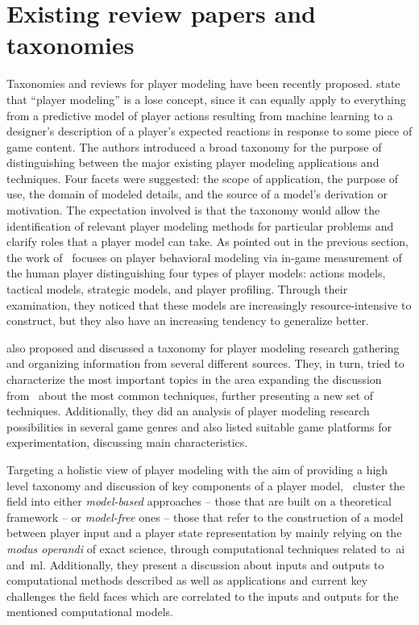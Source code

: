 \section{Existing review papers and taxonomies}\label{reviews}
Taxonomies and reviews for player modeling have been recently proposed. \cite{smith_inclusive_2011} state that ``player modeling'' is a lose concept, since it can equally apply to everything from a predictive model of player actions resulting from machine learning to a designer's description of a player's expected reactions in response to some piece of game content. The authors introduced a broad taxonomy for the purpose of distinguishing between the major existing player modeling applications and techniques. Four facets were suggested: the scope of application, the purpose of use, the domain of modeled details, and the source of a model's derivation or motivation. The expectation involved is that the taxonomy would allow the identification of relevant player modeling methods for particular problems and clarify roles that a player model can take. As pointed out in the previous section, the work of~\cite{bakkes_player_2012} focuses on player behavioral modeling via in-game measurement of the human player distinguishing four types of player models: actions models, tactical models, strategic models, and player profiling. %
Through their examination, they noticed that these models are increasingly resource-intensive to construct, but they also have an increasing tendency to generalize better.%

\cite{machado_player_2011} also proposed and discussed a taxonomy for player modeling research gathering and organizing information from several different sources. They, in turn, tried to characterize the most important topics in the area expanding the discussion from~\cite{herik_opponent_2005} about the most common techniques, further presenting a new set of techniques. Additionally, they did an analysis of player modeling research possibilities in several game genres and also listed suitable game platforms for experimentation, discussing main characteristics.

Targeting a holistic view of player modeling with the aim of providing a high level taxonomy and discussion of key components of a player model,~\cite{yannakakis_player_2013} cluster the field into either \textit{model-based} approaches -- those that are built on a theoretical framework -- or \textit{model-free} ones -- those that refer to the construction of a model between player input and a player state representation by mainly relying on the \textit{modus operandi} of exact science, through computational techniques related to~\gls{ai} and~\gls{ml}. Additionally, they present a discussion about inputs and outputs to computational methods described as well as applications and current key challenges the field faces which are correlated to the inputs and outputs for the mentioned computational models.

